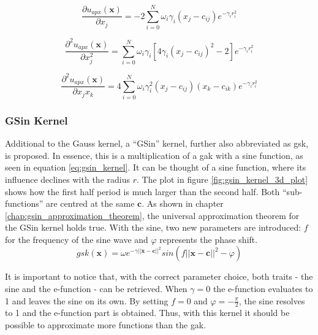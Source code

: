 \documentclass[./\jobname.tex]{subfiles}
\begin{document}
\begin{equation}
\label{eq:uapx_gauss_kernel_x0}
\frac{\partial u_{apx}(\mathbf{x})}{\partial x_j} = -2 \sum_{i=0}^{N} \omega_i \gamma_i (x_j - c_{ij}) e^{-\gamma_i r_i^2}
\end{equation}

\begin{equation}
\label{eq:uapx_gauss_kernel_x0x0}
\frac{\partial^2 u_{apx}(\mathbf{x})}{\partial x_j^2} = \sum_{i=0}^{N} \omega_i \gamma_i \left[ 4 \gamma_i (x_j - c_{ij})^2 - 2 \right] e^{-\gamma_i r_i^2}
\end{equation}

\begin{equation}
\label{eq:uapx_gauss_kernel_x0x1}
\frac{\partial^2 u_{apx}(\mathbf{x})}{\partial x_j x_k} = 4 \sum_{i=0}^{N} \omega_i \gamma_i^2 (x_j - c_{ij}) (x_k - c_{ik}) e^{-\gamma_i r_i^2} 
\end{equation}

\subsubsection{GSin Kernel}
\label{chap:gsin_kernel}
Additional to the Gauss kernel, a ``GSin'' kernel, further also abbreviated as \gls{gsk}, is proposed. In essence, this is a multiplication of a \gls{gak} with a sine function, as seen in equation \eqref{eq:gsin_kernel}. It can be thought of a sine function, where its influence declines with the radius $r$. The plot in figure \ref{fig:gsin_kernel_3d_plot} shows how the first half period is much larger than the second half. Both ``sub-functions'' are centred at the same $\mathbf{c}$. As shown in chapter \ref{chap:gsin_approximation_theorem}, the universal approximation theorem for the GSin kernel holds true. 
With the sine, two new parameters are introduced: $f$ for the frequency of the sine wave and $\varphi$ represents the phase shift. 
\begin{equation}
\label{eq:gsin_kernel}
gsk(\mathbf{x}) = \omega e^{-\gamma ||\mathbf{x} - \mathbf{c}||^2} sin(f ||\mathbf{x} - \mathbf{c}||^2 - \varphi)
\end{equation}

It is important to notice that, with the correct parameter choice, both traits - the sine and the e-function - can be retrieved. When $\gamma=0$ the e-function evaluates to 1 and leaves the sine on its own. By setting $f=0$ and $\varphi=-\frac{\pi}{2}$, the sine resolves to 1 and the e-function part is obtained. Thus, with this kernel it should be possible to approximate more functions than the \gls{gak}. 
\end{document}
